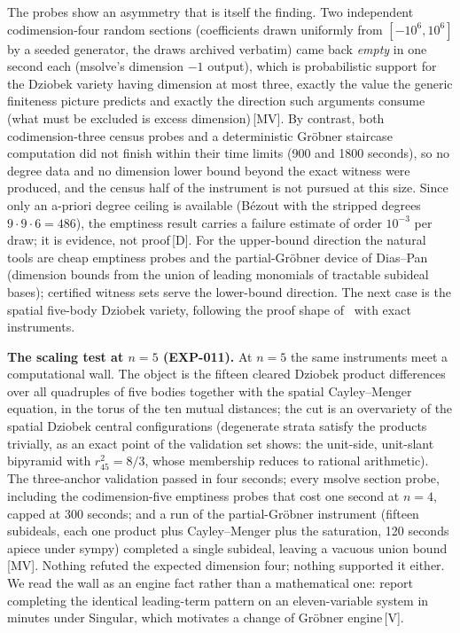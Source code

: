 \documentclass[11pt]{article}
\theoremstyle{definition}
\theoremstyle{remark}
\newcommand{\mk}[1]{\,{\scriptsize[#1]}}
\newcommand{\MV}{\mk{MV}}
\newcommand{\Dm}{\mk{D}}
\newcommand{\Vm}{\mk{V}}
\begin{document}
The probes show an asymmetry that is itself the finding. Two independent
codimension-four random sections
(coefficients drawn uniformly from $[-10^6,10^6]$ by a seeded generator, the
draws archived verbatim) came back \emph{empty} in one second each (msolve's
dimension $-1$ output), which is probabilistic support for the Dziobek
variety having dimension at most three, exactly the value the generic
finiteness picture predicts and exactly the direction such arguments consume
(what must be excluded is excess dimension)\MV. By contrast, both
codimension-three census probes and a deterministic Gr\"obner staircase
computation did not finish within their time limits (900 and 1800 seconds), so
no degree data and no dimension lower bound beyond the exact witness were
produced, and the census half of the instrument is not pursued at this size. Since only an a-priori degree ceiling is
available (B\'ezout with the stripped degrees $9\cdot 9\cdot 6 = 486$), the
emptiness result carries a failure estimate of order $10^{-3}$ per draw; it is
evidence, not proof\Dm. For the upper-bound direction the natural tools are cheap
emptiness probes and the partial-Gr\"obner device of Dias--Pan~\cite{DP18}
(dimension bounds from the union of leading monomials of tractable subideal
bases); certified witness sets serve the lower-bound direction. The next case is
the spatial five-body Dziobek variety, following the proof shape of~\cite{DP18}
with exact instruments.

\medskip
\noindent\textbf{The scaling test at $n=5$ (EXP-011).} At $n=5$ the same
instruments meet a computational wall. The object is the fifteen cleared Dziobek
product differences over all quadruples of five bodies together with the spatial
Cayley--Menger equation, in the torus of the ten mutual distances; the cut is an
overvariety of the spatial Dziobek central configurations (degenerate strata
satisfy the products trivially, as an exact point of the validation set shows:
the unit-side, unit-slant bipyramid with $r_{45}^2 = 8/3$, whose membership
reduces to rational arithmetic). The three-anchor validation passed in four
seconds; every msolve section probe, including the codimension-five emptiness
probes that cost one second at $n=4$, capped at 300 seconds; and a run of the
partial-Gr\"obner instrument (fifteen subideals, each one product plus
Cayley--Menger plus the saturation, 120 seconds apiece under sympy) completed
a single subideal, leaving a vacuous union bound\MV. Nothing refuted the expected
dimension four; nothing supported it either. We read the wall as an engine
fact rather than a mathematical one: \cite{DP18} report completing the
identical leading-term pattern on an eleven-variable system in minutes under
Singular, which motivates a change of Gr\"obner engine\Vm.
\end{document}
